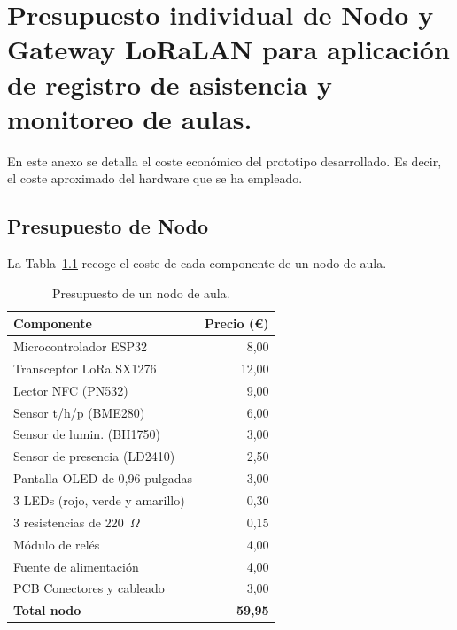 \chapter{Presupuesto individual de Nodo y Gateway LoRaLAN para aplicación de registro de asistencia y monitoreo de aulas.}\label{anexo_B}

En este anexo se detalla el coste económico del prototipo desarrollado. Es decir, el coste aproximado del hardware que se ha empleado.

\section{Presupuesto de Nodo}

La Tabla~\ref{tab:presupuesto-nodo} recoge el coste de cada componente de un nodo de aula.

\begin{table}[H]
    \centering
    \caption{Presupuesto de un nodo de aula.}
    \label{tab:presupuesto-nodo}
    \renewcommand{\arraystretch}{1.2}
    \begin{tabularx}{0.6\textwidth}{X r}
        \toprule
        \textbf{Componente} & \textbf{Precio (\euro)} \\
        \midrule
        Microcontrolador ESP32                  & 8,00  \\
        Transceptor LoRa SX1276                 & 12,00 \\
        Lector NFC (PN532)                      & 9,00  \\
        Sensor t/h/p (BME280)      & 6,00  \\
        Sensor de lumin. (BH1750)          & 3,00  \\
        Sensor de presencia (LD2410)            & 2,50  \\
        Pantalla OLED de 0,96 pulgadas          & 3,00  \\
        3 LEDs (rojo, verde y amarillo)         & 0,30  \\
        3 resistencias de 220~$\Omega$          & 0,15  \\
        Módulo de relés                         & 4,00  \\
        Fuente de alimentación                  & 4,00  \\
        PCB
        Conectores y cableado                   & 3,00  \\
        \midrule
        \textbf{Total nodo} & \textbf{59,95} \\
        \bottomrule
    \end{tabularx}
\end{table}

